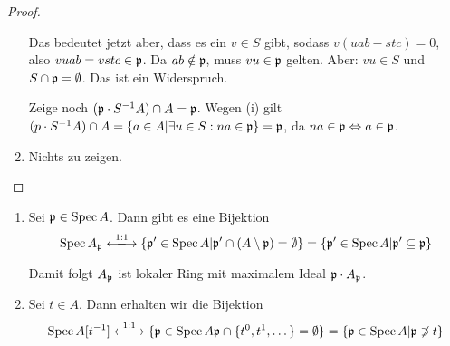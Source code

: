 \documentclass[12pt,a4paper]{scrartcl}
\theoremstyle{cplain}
\theoremstyle{cdef}
\begin{document}
\begin{proof}
\begin{enumerate}
		Das bedeutet jetzt aber, dass es ein $v\in S$ gibt, sodass $v(uab-stc) = 0$, also $vuab = vstc\in \mathfrak{p}$. Da $ab\notin \mathfrak{p}$, muss $vu\in\mathfrak{p}$ gelten. Aber: $vu\in S$ und $S\cap\mathfrak{p} = \emptyset$. Das ist ein Widerspruch.
		
		Zeige noch $(\mathfrak{p}\cdot S^{-1}A)\cap  A = \mathfrak{p}$. Wegen (i) gilt $(p\cdot S^{-1}A)\cap A = \{a\in A|\exists u\in S: na \in \mathfrak{p}\} = \mathfrak{p}$, da $na\in \mathfrak{p}\Leftrightarrow a \in \mathfrak{p}$.
		\item Nichts zu zeigen.
	\end{enumerate}
\end{proof}

\begin{bsp}
	\leavevmode
	\begin{enumerate}
		\item Sei $\mathfrak{p}\in\operatorname{Spec} A$. Dann gibt es eine Bijektion
		$$\Spec A_{\fp} \xlongleftrightarrow{1:1} \{\fp'\in \Spec A|\fp'\cap(A\setminus \fp) = \emptyset\}  = \{\fp'\in \Spec A|\fp'\subseteq \fp\}$$
		
		Damit folgt $A_{\mathfrak{p}}$ ist lokaler Ring mit maximalem Ideal $\mathfrak{p}\cdot A_{\mathfrak{p}}$.
		\item Sei $t\in A$. Dann erhalten wir die Bijektion
		$$\Spec A[t^{-1}] \xlongleftrightarrow{1:1}\{\fp\in \Spec A\fp\cap\{t^0, t^1,\dots\} = \emptyset\} = \{\fp\in \Spec A|\fp\not \ni t\}$$
	\end{enumerate}
\end{bsp}
\end{document}
